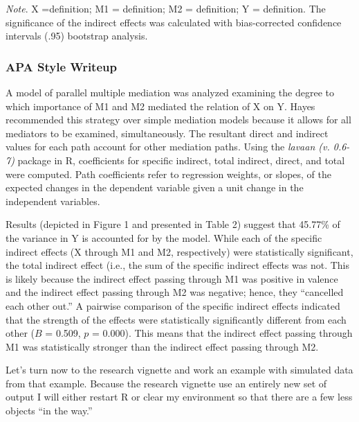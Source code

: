 \documentclass[
  11pt,
]{book}
\begin{document}
\begin{longtable}[]{@{}
  >{\raggedright\arraybackslash}p{}@{}}
\toprule
\endhead
\bottomrule
\end{longtable}

\emph{Note}. X =definition; M1 = definition; M2 = definition; Y = definition. The significance of the indirect effects was calculated with bias-corrected confidence intervals (.95) bootstrap analysis.

\hypertarget{apa-style-writeup}{%
\subsubsection{APA Style Writeup}\label{apa-style-writeup}}

A model of parallel multiple mediation was analyzed examining the degree to which importance of M1 and M2 mediated the relation of X on Y. Hayes \citeyearpar{hayes_introduction_2018} recommended this strategy over simple mediation models because it allows for all mediators to be examined, simultaneously. The resultant direct and indirect values for each path account for other mediation paths. Using the \emph{lavaan (v. 0.6-7)} package in R, coefficients for specific indirect, total indirect, direct, and total were computed. Path coefficients refer to regression weights, or slopes, of the expected changes in the dependent variable given a unit change in the independent variables.

Results (depicted in Figure 1 and presented in Table 2) suggest that 45.77\% of the variance in Y is accounted for by the model. While each of the specific indirect effects (X through M1 and M2, respectively) were statistically significant, the total indirect effect (i.e., the sum of the specific indirect effects was not. This is likely because the indirect effect passing through M1 was positive in valence and the indirect effect passing through M2 was negative; hence, they ``cancelled each other out.'' A pairwise comparison of the specific indirect effects indicated that the strength of the effects were statistically significantly different from each other (\(B\) = 0.509, \(p\) = 0.000). This means that the indirect effect passing through M1 was statistically stronger than the indirect effect passing through M2.

Let's turn now to the research vignette and work an example with simulated data from that example. Because the research vignette use an entirely new set of output I will either restart R or clear my environment so that there are a few less objects ``in the way.''
\end{document}
